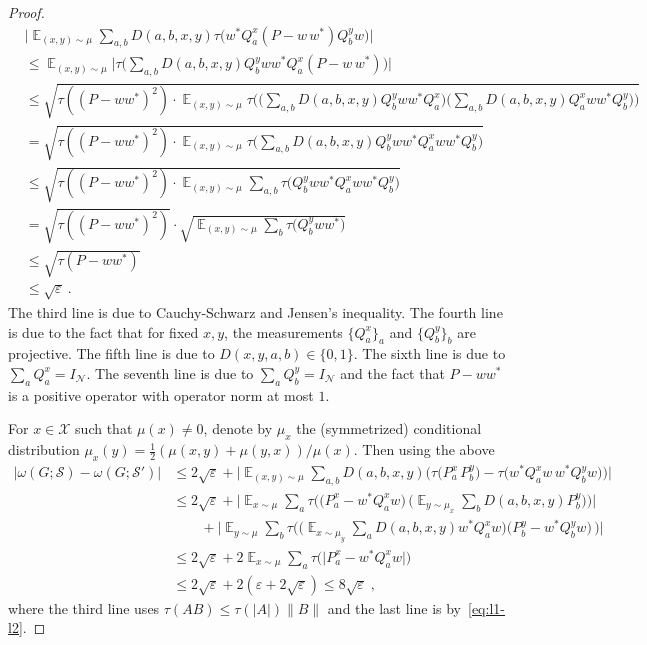 \documentclass[11pt]{article}
\theoremstyle{definition}
\newcommand{\strategy}{\mathscr{S}}
\DeclareMathOperator*{\Expectation}{\mathbb{E}}
\newcommand{\Es}[1]{\Expectation_{#1}}
\newcommand{\mX}{\ensuremath{\mathcal{X}}}
\newcommand{\eps}{\varepsilon}
\newcommand{\mN}{\mathcal{N}}
\begin{document}
\begin{proof}
\begin{align*}
&\Big|\Es{(x,y)\sim\mu} \sum_{a,b} D(a,b,x,y)  \tau\big( w^* Q^x_a (P - w\, w^* ) Q^y_b w\big)\Big|\\
&\leq \Es{(x,y)\sim\mu} \Big | \tau\big( \sum_{a,b} D(a,b,x,y)   Q^y_b w w^* Q^x_a (P - w\, w^* ) \big) \Big | \\
&\leq \sqrt{ \tau((P - ww^*)^2) \cdot \Es{(x,y)\sim\mu} \tau\big( \big( \sum_{a,b} D(a,b,x,y)   Q^y_b w w^* Q^x_a \big) \big( \sum_{a,b} D(a,b,x,y)   Q^x_a w w^* Q^y_b \big) \big) } \\
&= \sqrt{ \tau((P - ww^*)^2) \cdot \Es{(x,y)\sim\mu} \tau\big( \sum_{a,b} D(a,b,x,y)   Q^y_b ww^* Q^x_a w w^* Q^y_b \big) } \\
&\leq \sqrt{\tau((P - ww^*)^2) \cdot \Es{(x,y)\sim\mu}  \sum_{a,b}  \tau\big(Q^y_b ww^* Q^x_a w w^* Q^y_b \big) }  \\
&= \sqrt{\tau((P - ww^*)^2)} \cdot \sqrt{ \Es{(x,y)\sim\mu}  \sum_{b}  \tau\big(Q^y_b ww^* \big) } \\
&\leq \sqrt{\tau(P - ww^*)} \\
&\leq \sqrt{\eps}~.
\end{align*}
The third line is due to Cauchy-Schwarz and Jensen's inequality. The fourth line is due to the fact that for fixed $x,y$, the measurements $\{ Q^x_a \}_a$ and $\{Q^y_b\}_b$ are projective. The fifth line is due to $D(x,y,a,b) \in \{0,1\}$. The sixth line is due to $\sum_a Q^x_a = I_\mN$. The seventh line is due to $\sum_a Q^y_b = I_\mN$ and the fact that $P - ww^*$ is a positive operator with operator norm at most $1$.

For $x\in \mX$ such that $\mu(x)\neq 0$, denote by $\mu_x$ the (symmetrized) conditional distribution $\mu_x(y)=\frac{1}{2}(\mu(x,y)+\mu(y,x))/\mu(x)$. Then using the above
\begin{align*}
\big|\omega(G;\strategy) - \omega(G;\strategy')\big|
 &\leq 2\sqrt{\eps}+ \Big|\Es{(x,y)\sim\mu} \sum_{a,b} D(a,b,x,y) \big( \tau\big( P^x_a \, P^y_b \big)-\tau\big( w^* Q^x_a w\, w^* Q^y_b w\big)\big)\Big|\\
&\leq  2\sqrt{\eps}+ \Big|\Es{x\sim\mu} \sum_{a}  \tau\Big( \big(P^x_a-w^* Q^x_aw\big) \, \Big( \Es{y\sim \mu_x} \sum_b D(a,b,x,y) P^y_b \Big)\Big)\Big|\\
&\qquad+ \Big|\Es{y\sim\mu} \sum_{b}  \tau\Big(\Big( \Es{x\sim \mu_y} \sum_a D(a,b,x,y) w^* Q^x_a w\Big) \big(P^y_b-w^*Q^y_bw\big) \, \Big)\Big|\\
&\leq 2\sqrt{\eps}+2\Es{x\sim\mu} \sum_{a}  \tau\big(\big| P^x_a-w^*Q^x_aw\big|\big) \\
&\leq 2\sqrt{\eps}+2(\eps + 2\sqrt{\eps}) \leq 8\sqrt{\eps}\;,
\end{align*}
where the third line uses $\tau(AB)\leq\tau(|A|)\|B\|$ and the last line is by~\eqref{eq:l1-l2}.%
\end{proof}
\end{document}
